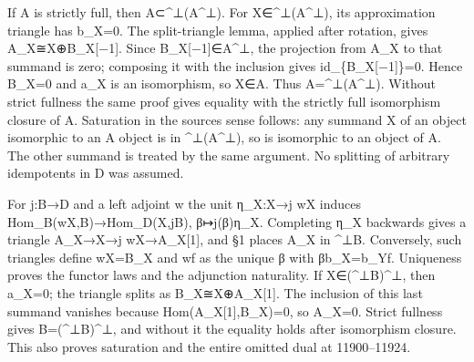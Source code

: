\documentclass[11pt]{article}
\begin{document}
If A is strictly full,\allowbreak{} then A⊂\textasciicircum{}⊥(A\textasciicircum{}⊥)\allowbreak{}. For X\allowbreak{}∈\textasciicircum{}⊥(A\textasciicircum{}⊥)\allowbreak{},\allowbreak{} its approximation triangle has b\_\allowbreak{}X\allowbreak{}=0. The split-triangle lemma,\allowbreak{} applied after rotation,\allowbreak{} gives A\_\allowbreak{}X≅X\allowbreak{}⊕B\_\allowbreak{}X[−1]\allowbreak{}. Since B\_\allowbreak{}X[−1]\allowbreak{}\allowbreak{}∈A\textasciicircum{}⊥,\allowbreak{} the projection from A\_\allowbreak{}X to that summand is zero; composing it with the inclusion gives id\_\allowbreak{}\{B\_\allowbreak{}X[−1]\allowbreak{}\}\allowbreak{}=0. Hence B\_\allowbreak{}X\allowbreak{}=0 and a\_\allowbreak{}X is an isomorphism,\allowbreak{} so X\allowbreak{}∈A. Thus A\allowbreak{}=\textasciicircum{}⊥(A\textasciicircum{}⊥)\allowbreak{}. Without strict fullness the same proof gives equality with the strictly full isomorphism closure of A. Saturation in the source\textquotesingle s sense follows:\allowbreak{} any summand X of an object isomorphic to an A object is in \textasciicircum{}⊥(A\textasciicircum{}⊥)\allowbreak{},\allowbreak{} so is isomorphic to an object of A. The other summand is treated by the same argument. No splitting of arbitrary idempotents in D was assumed.

For j:\allowbreak{}B\allowbreak{}→D and a left adjoint w the unit η\_\allowbreak{}X:\allowbreak{}X\allowbreak{}→j wX induces Hom\_\allowbreak{}B(wX,\allowbreak{}B)\allowbreak{}\allowbreak{}→Hom\_\allowbreak{}D(X,\allowbreak{}jB)\allowbreak{},\allowbreak{} β\allowbreak{}↦j(β)\allowbreak{}η\_\allowbreak{}X. Completing η\_\allowbreak{}X backwards gives a triangle A\_\allowbreak{}X\allowbreak{}→X\allowbreak{}→j wX\allowbreak{}→A\_\allowbreak{}X[1]\allowbreak{},\allowbreak{} and §1 places A\_\allowbreak{}X in \^{}⊥B. Conversely,\allowbreak{} such triangles define wX\allowbreak{}=B\_\allowbreak{}X and wf as the unique β with βb\_\allowbreak{}X\allowbreak{}=b\_\allowbreak{}Yf. Uniqueness proves the functor laws and the adjunction naturality. If X\allowbreak{}∈(\textasciicircum{}⊥B)\allowbreak{}\textasciicircum{}⊥,\allowbreak{} then a\_\allowbreak{}X\allowbreak{}=0; the triangle splits as B\_\allowbreak{}X≅X\allowbreak{}⊕A\_\allowbreak{}X[1]\allowbreak{}. The inclusion of this last summand vanishes because Hom(A\_\allowbreak{}X[1]\allowbreak{},\allowbreak{}B\_\allowbreak{}X)\allowbreak{}\allowbreak{}=0,\allowbreak{} so A\_\allowbreak{}X\allowbreak{}=0. Strict fullness gives B\allowbreak{}=(\textasciicircum{}⊥B)\allowbreak{}\textasciicircum{}⊥,\allowbreak{} and without it the equality holds after isomorphism closure. This also proves saturation and the entire omitted dual at 11900–\allowbreak{}11924.
\end{document}

